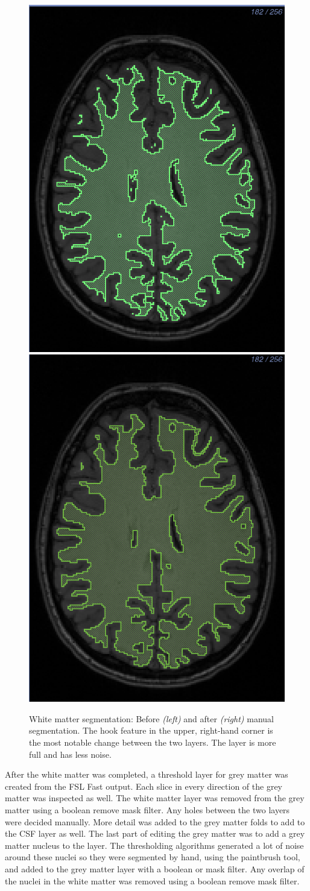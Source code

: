 \begin{figure}[H]
\begin{center}
\includegraphics[width=.49\textwidth]{Figures/whitematter_before}
\includegraphics[width=.49\textwidth]{Figures/whitematter_after}
\caption{White matter segmentation: Before \textit{(left)} and after \textit{(right)} manual segmentation. The hook feature in the upper, right-hand corner is the most notable change between the two layers. The layer is more full and has less noise.}
\label{fig:wm}
\end{center}
\end{figure}

After the white matter was completed, a threshold layer for grey matter was created from the FSL Fast output. Each slice in every direction of the grey matter was inspected as well. The white matter layer was removed from the grey matter using a boolean remove mask filter. Any holes between the two layers were decided manually. More detail was added to the grey matter folds to add to the CSF layer as well. The last part of editing the grey matter was to add a grey matter nucleus to the layer. The thresholding algorithms generated a lot of noise around these nuclei so they were segmented by hand, using the paintbrush tool, and added to the grey matter layer with a boolean or mask filter. Any overlap of the nuclei in the white matter was removed using a boolean remove mask filter.

